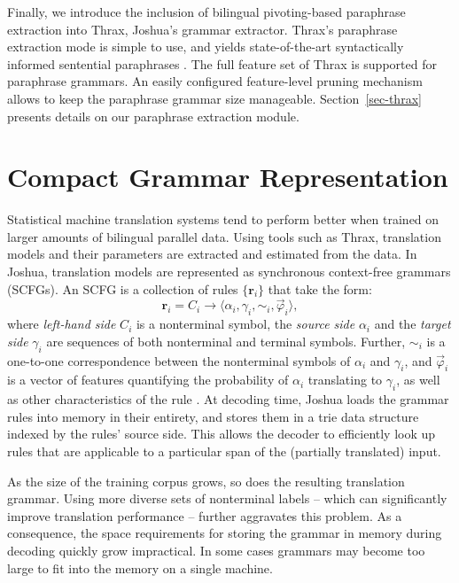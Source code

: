 \documentclass[11pt]{article}
\begin{document}
Finally, we introduce the inclusion of bilingual pivoting-based
paraphrase extraction into Thrax, Joshua's grammar extractor. Thrax's
paraphrase extraction mode is simple to use, and yields
state-of-the-art syntactically informed sentential paraphrases
\cite{Ganitkevitch2011}. The full feature set of Thrax
\cite{Joshua-3.0} is supported for paraphrase grammars. An easily
configured feature-level pruning mechanism allows to keep the
paraphrase grammar size manageable. Section~\ref{sec-thrax} presents
details on our paraphrase extraction module.

\section{Compact Grammar Representation}
\label{sec-compact-grammar}

Statistical machine translation systems tend to perform better when
trained on larger amounts of bilingual parallel data. Using tools such
as Thrax, translation models and their parameters are extracted and
estimated from the data. In Joshua, translation models are represented
as synchronous context-free grammars (SCFGs). An SCFG is a collection
of rules $\{\mathbf{r}_i\}$ that take the form:
\begin{equation}
 \mathbf{r}_i = C_i \to \langle \alpha_i , \gamma_i , \sim_i, \vec{\varphi}_i \rangle ,
\end{equation}
where \emph{left-hand side} $C_i$ is a nonterminal symbol, the
\emph{source side} $\alpha_i$ and the \emph{target side} $\gamma_i$
are sequences of both nonterminal and terminal symbols. Further,
$\sim_i$ is a one-to-one correspondence between the nonterminal
symbols of $\alpha_i$ and $\gamma_i$, and $\vec{\varphi}_i$ is a
vector of features quantifying the probability of $\alpha_i$
translating to $\gamma_i$, as well as other characteristics of the
rule \cite{Joshua-3.0}. At decoding time, Joshua loads the grammar
rules into memory in their entirety, and stores them in a trie data
structure indexed by the rules' source side. This allows the decoder
to efficiently look up rules that are applicable to a particular span
of the (partially translated) input.

As the size of the training corpus grows, so does the resulting
translation grammar. Using more diverse sets of nonterminal labels --
which can significantly improve translation performance -- further
aggravates this problem. As a consequence, the space requirements for
storing the grammar in memory during decoding quickly grow
impractical. In some cases grammars may become too large to fit into
the memory on a single machine.
\end{document}
